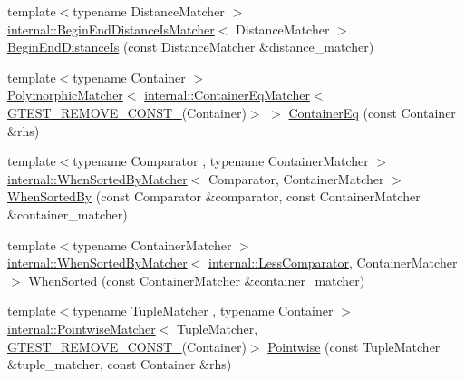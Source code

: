 \begin{DoxyCompactItemize}
\item 
{\footnotesize template$<$typename Distance\+Matcher $>$ }\\\hyperlink{classtesting_1_1internal_1_1BeginEndDistanceIsMatcher}{internal\+::\+Begin\+End\+Distance\+Is\+Matcher}$<$ Distance\+Matcher $>$ \hyperlink{namespacetesting_a122739b5b6bd9f993f26800dafdb4cc3}{Begin\+End\+Distance\+Is} (const Distance\+Matcher \&distance\+\_\+matcher)
\item 
{\footnotesize template$<$typename Container $>$ }\\\hyperlink{classtesting_1_1PolymorphicMatcher}{Polymorphic\+Matcher}$<$ \hyperlink{classtesting_1_1internal_1_1ContainerEqMatcher}{internal\+::\+Container\+Eq\+Matcher}$<$ \hyperlink{gtest-internal_8h_a2ffec8c60510eb130af387f5ce9a756a}{G\+T\+E\+S\+T\+\_\+\+R\+E\+M\+O\+V\+E\+\_\+\+C\+O\+N\+S\+T\+\_\+}(Container)$>$ $>$ \hyperlink{namespacetesting_a5928ffc4e976a4da981512c422792840}{Container\+Eq} (const Container \&rhs)
\item 
{\footnotesize template$<$typename Comparator , typename Container\+Matcher $>$ }\\\hyperlink{classtesting_1_1internal_1_1WhenSortedByMatcher}{internal\+::\+When\+Sorted\+By\+Matcher}$<$ Comparator, Container\+Matcher $>$ \hyperlink{namespacetesting_af74dfcde9ed88d79cf69dfda049078a3}{When\+Sorted\+By} (const Comparator \&comparator, const Container\+Matcher \&container\+\_\+matcher)
\item 
{\footnotesize template$<$typename Container\+Matcher $>$ }\\\hyperlink{classtesting_1_1internal_1_1WhenSortedByMatcher}{internal\+::\+When\+Sorted\+By\+Matcher}$<$ \hyperlink{structtesting_1_1internal_1_1LessComparator}{internal\+::\+Less\+Comparator}, Container\+Matcher $>$ \hyperlink{namespacetesting_a01468e3e641c72a2efb605b4c34675ee}{When\+Sorted} (const Container\+Matcher \&container\+\_\+matcher)
\item 
{\footnotesize template$<$typename Tuple\+Matcher , typename Container $>$ }\\\hyperlink{classtesting_1_1internal_1_1PointwiseMatcher}{internal\+::\+Pointwise\+Matcher}$<$ Tuple\+Matcher, \hyperlink{gtest-internal_8h_a2ffec8c60510eb130af387f5ce9a756a}{G\+T\+E\+S\+T\+\_\+\+R\+E\+M\+O\+V\+E\+\_\+\+C\+O\+N\+S\+T\+\_\+}(Container)$>$ \hyperlink{namespacetesting_a51ee81f6f1723f7a7aff0429b1d76ec1}{Pointwise} (const Tuple\+Matcher \&tuple\+\_\+matcher, const Container \&rhs)
\item 

\end{DoxyCompactItemize}
